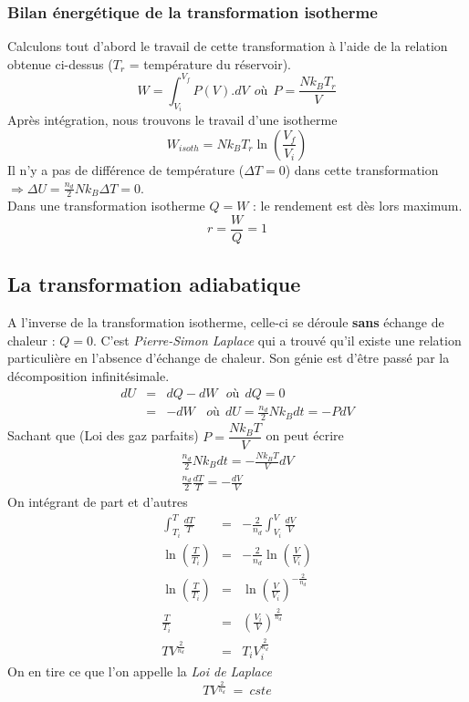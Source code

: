 \documentclass	[11pt, a4paper, openany]{book}
\begin{document}
\subsubsection{Bilan énergétique de la transformation isotherme}
Calculons tout d'abord le travail de cette transformation à l'aide de la relation obtenue ci-dessus ($T_r$ = température du réservoir).
\begin{equation}
	W = \int_{V_i}^{V_f} P(V).dV\ \ où\ \ P = \frac{Nk_BT_r}{V}
\end{equation}
Après intégration, nous trouvons le travail d'une isotherme
\begin{equation}
	W_{isoth} = Nk_BT_r \ln\left(\frac{V_f}{V_i}\right)
\end{equation}
Il n'y a pas de différence de température ($\Delta T = 0$) dans cette transformation $\Rightarrow \Delta U = \frac{n_d}{2}Nk_B\Delta T = 0$.\\
Dans une transformation isotherme $Q = W$ : le rendement est dès lors maximum.
\begin{equation}
	r = \frac{W}{Q} = 1
\end{equation}

\subsection{La transformation adiabatique}
A l'inverse de la transformation isotherme, celle-ci se déroule \textbf{sans} échange de chaleur : $Q = 0$. C'est \textit{Pierre-Simon Laplace} qui a trouvé qu'il existe une relation particulière en l'absence d'échange de chaleur. Son génie est d'être passé par la décomposition infinitésimale.
\begin{eqnarray}
	dU &=& dQ - dW\ \ \ où\ \ dQ = 0\\
	&=& - dW \ \ \ \ où\ \ dU = \frac{n_d}{2}Nk_B dt = - PdV
\end{eqnarray}
Sachant que (Loi des gaz parfaits) $P = \dfrac{Nk_BT}{V}$ on peut écrire 
\begin{eqnarray}
	\frac{n_d}{2}Nk_Bdt = - \frac{Nk_BT}{V}dV\\
	\frac{n_d}{2}\frac{dT}{T} = - \frac{dV}{V}
\end{eqnarray}
On intégrant de part et d'autres
\begin{eqnarray}
	\int_{T_i}^{T} \frac{dT}{T} &=& -\frac{2}{n_d}\int_{V_i}^{V} \frac{dV}{V}\\
	\ln\left(\frac{T}{T_i}\right) &=& -\frac{2}{n_d}\ln\left(\frac{V}{V_i}\right)\\
	\ln\left(\frac{T}{T_i}\right) &=& \ln\left(\frac{V}{V_i}\right)^{-\frac{2}{n_d}}\\
	\frac{T}{T_i} &=& \left(\frac{V_i}{V}\right)^{\frac{2}{n_d}}\\
	TV^{\frac{2}{n_d}} &=& T_iV_i^{\frac{2}{n_d}}
\end{eqnarray}
On en tire ce que l'on appelle la \textit{Loi de Laplace}
\begin{equation}
	TV^{\frac{2}{n_d}}\ =\ cste
\end{equation}
\end{document}
